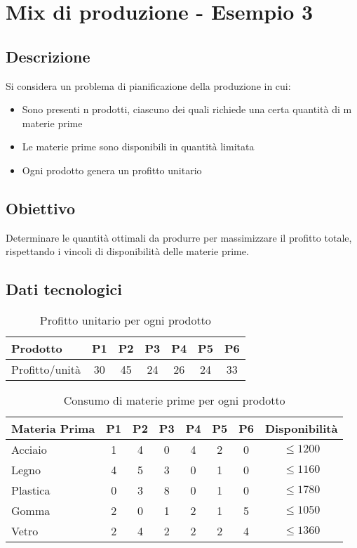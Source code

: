 \section{Mix di produzione - Esempio 3}

\subsection{Descrizione}
Si considera un problema di pianificazione della produzione in cui:
\begin{itemize}
    \item Sono presenti n prodotti, ciascuno dei quali richiede una certa quantità di m materie prime
    \item Le materie prime sono disponibili in quantità limitata
    \item Ogni prodotto genera un profitto unitario
\end{itemize}

\subsection{Obiettivo}
Determinare le quantità ottimali da produrre per massimizzare il profitto totale, rispettando i vincoli di disponibilità delle materie prime.

\subsection{Dati tecnologici}
\begin{table}[h]
\centering
\begin{tabular}{|l|c|c|c|c|c|c|}
\hline
Prodotto      & P1 & P2 & P3 & P4 & P5 & P6 \\ \hline
Profitto/unità & 30 & 45 & 24 & 26 & 24 & 33 \\ \hline
\end{tabular}
\caption{Profitto unitario per ogni prodotto}
\end{table}

\begin{table}[h]
\centering
\begin{tabular}{|l|c|c|c|c|c|c|c|}
\hline
Materia Prima & P1 & P2 & P3 & P4 & P5 & P6 & Disponibilità \\ \hline
Acciaio     & 1  & 4  & 0  & 4  & 2  & 0  & $\leq 1200$ \\ \hline
Legno       & 4  & 5  & 3  & 0  & 1  & 0  & $\leq 1160$ \\ \hline
Plastica    & 0  & 3  & 8  & 0  & 1  & 0  & $\leq 1780$ \\ \hline
Gomma       & 2  & 0  & 1  & 2  & 1  & 5  & $\leq 1050$ \\ \hline
Vetro       & 2  & 4  & 2  & 2  & 2  & 4  & $\leq 1360$ \\ \hline
\end{tabular}
\caption{Consumo di materie prime per ogni prodotto}
\end{table}

